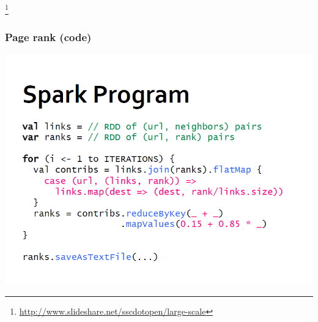\documentclass{beamer}
\begin{document}
{
  \pagecolor{white}

\begin{frame}[plain]
\footnote{\url{http://www.slideshare.net/sscdotopen/large-scale}}

\end{frame}
}

\begin{frame}
\frametitle{Page rank (code)}
\includegraphics[width=\textwidth]{images/example.png}
\end{frame}
\end{document}
